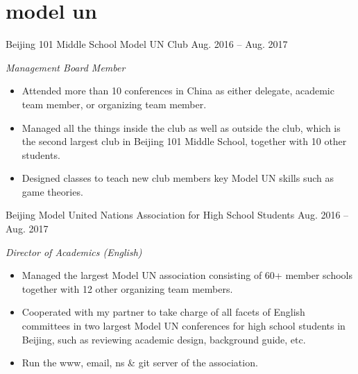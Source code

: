 \documentclass[]{adamyi-cv} %
\begin{document}

\section{model un}

\begin{entrylist}


\entry
{Beijing 101 Middle School Model UN Club}
{Aug. 2016 -- Aug. 2017}
{\emph{Management Board Member}
\begin{itemize}
\item Attended more than 10 conferences in China as either delegate, academic team member, or organizing team member.
\item Managed all the things inside the club as well as outside the club, which is the second largest club in Beijing 101 Middle School, together with 10 other students.
\item Designed classes to teach new club members key Model UN skills such as game theories.
\end{itemize}}


\entry
{Beijing Model United Nations Association for High School Students}
{Aug. 2016 -- Aug. 2017}
{\emph{Director of Academics (English)}
\begin{itemize}
\item Managed the largest Model UN association consisting of 60+ member schools together with 12 other organizing team members.
\item Cooperated with my partner to take charge of all facets of English committees in two largest Model UN conferences for high school students in Beijing, such as reviewing academic design, background guide, etc.
\item Run the www, email, ns \& git server of the association.
\end{itemize}}


\end{entrylist}

\pagebreak


\end{document}
